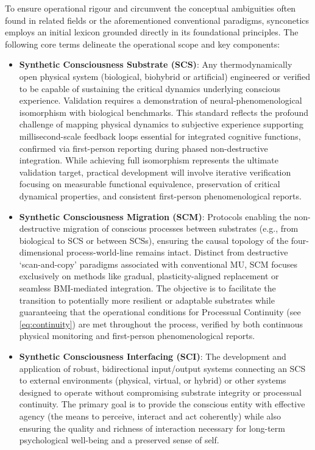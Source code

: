 \documentclass[10pt]{article}
\begin{document}
\begin{sloppypar}
  To ensure operational rigour and circumvent the conceptual ambiguities often found in related fields or the aforementioned conventional paradigms, synconetics employs an initial lexicon grounded directly in its foundational principles. The following core terms delineate the operational scope and key components:

  \begin{itemize}
    \item \textbf{Synthetic Consciousness Substrate (SCS)}: Any thermodynamically open physical system (biological, biohybrid or artificial) engineered or verified to be capable of sustaining the critical dynamics underlying conscious experience. Validation requires a demonstration of neural-phenomenological isomorphism with biological benchmarks. This standard reflects the profound challenge of mapping physical dynamics to subjective experience supporting millisecond-scale feedback loops essential for integrated cognitive functions, confirmed via first-person reporting during phased non-destructive integration. While achieving full isomorphism represents the ultimate validation target, practical development will involve iterative verification focusing on measurable functional equivalence, preservation of critical dynamical properties, and consistent first-person phenomenological reports.

    \item \textbf{Synthetic Consciousness Migration (SCM)}: Protocols enabling the non-destructive migration of conscious processes between substrates (e.g., from biological to SCS or between SCSs), ensuring the causal topology of the four-dimensional process-world-line remains intact. Distinct from destructive ‘scan-and-copy’ paradigms associated with conventional MU, SCM focuses exclusively on methods like gradual, plasticity-aligned replacement or seamless BMI-mediated integration. The objective is to facilitate the transition to potentially more resilient or adaptable substrates while guaranteeing that the operational conditions for Processual Continuity (see \autoref{eq:continuity}) are met throughout the process, verified by both continuous physical monitoring and first-person phenomenological reports.

    \item \textbf{Synthetic Consciousness Interfacing (SCI)}: The development and application of robust, bidirectional input/output systems connecting an SCS to external environments (physical, virtual, or hybrid) or other systems designed to operate without compromising substrate integrity or processual continuity. The primary goal is to provide the conscious entity with effective agency (the means to perceive, interact and act coherently) while also ensuring the quality and richness of interaction necessary for long-term psychological well-being and a preserved sense of self.


\end{itemize}
\end{sloppypar}
\end{document}

